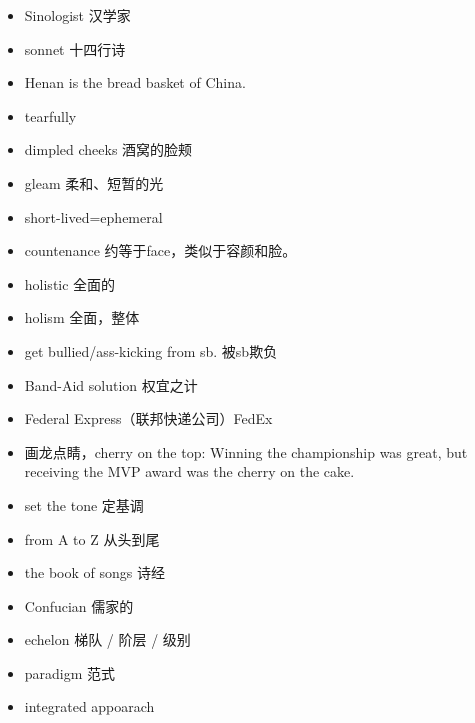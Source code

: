 \documentclass{ctexart}
\newif\ifpreface
\begin{document}
\large
\setlength{\baselineskip}{1.2em}
\ifpreface
    
\newgeometry{left=2cm,right=2cm,top=2cm,bottom=2cm}
\else
{}
\maketitle
\fi
\begin{itemize}
\item Sinologist 汉学家
\item sonnet 十四行诗
\item Henan is the bread basket of China.
\item tearfully
\item dimpled cheeks 酒窝的脸颊
\item gleam 柔和、短暂的光
\item short-lived=ephemeral
\item countenance 约等于face，类似于容颜和脸。
\item holistic 全面的
\item holism 全面，整体
\item get bullied/ass-kicking from sb. 被sb欺负
\item Band-Aid solution 权宜之计
\item Federal Express（联邦快递公司）FedEx
\item 画龙点睛，cherry on the top: Winning the championship was great, but receiving the MVP award was the cherry on the cake. 
\item set the tone 定基调
\item from A to Z 从头到尾
\item the book of songs 诗经
\item Confucian 儒家的
\item echelon 梯队 / 阶层 / 级别
\item paradigm 范式
\item integrated appoarach
\end{itemize}
\end{document}
